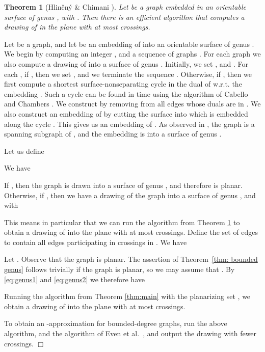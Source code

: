 \documentclass[twoside,leqno,twocolumn]{article}
\newtheorem{theorem}{Theorem}
\begin{document}
\begin{theorem}[Hlin\v{e}n\'{y} \& Chimani \cite{crossing_genus}]\label{thm:genus_soda}
Let  be a graph embedded in an orientable surface of genus , with .
Then there is an efficient algorithm that computes a drawing of  in the plane with at most  crossings.
\end{theorem}

Let  be a graph, and let  be an embedding of  into an orientable surface  of genus .
We begin by computing an integer , and a sequence of graphs .
For each graph  we also compute a drawing  of  into a surface of genus .
Initially, we set , and .
For each , if , then we set , and we terminate the sequence .
Otherwise, if , then 
we first compute a shortest surface-nonseparating cycle  in the dual of  w.r.t. the embedding . Such a cycle can be found in time  using the
algorithm of Cabello and Chambers \cite{CabelloC07}.
We construct  by removing from  all edges whose duals are in .
We also construct an embedding of  by cutting the surface into which  is embedded along the cycle .
This gives us an embedding  of .
As observed in \cite{crossing_genus}, the graph  is a spanning subgraph of , and the embedding  is into a surface of genus .

Let us define

We have


If , then the graph  is drawn into a surface of genus , and therefore  is planar.
Otherwise, if , then we have a drawing  of the graph  into a surface of genus , and with

This means in particular that we can run the algorithm from Theorem \ref{thm:genus_soda} to obtain a drawing  of  into the plane with at most  crossings.
Define the set  of edges to contain all edges participating in crossings in .
We have


Let .
Observe that the graph  is planar.
The assertion of Theorem~\ref{thm: bounded genus} follows trivially if the graph  is planar, so we may assume that .
By \eqref{eq:genus1} and \eqref{eq:genus2} we therefore have

Running the algorithm from Theorem \ref{thm:main} with the planarizing set , we obtain a drawing of  into the plane with at most  crossings.

To obtain an -approximation for bounded-degree graphs, 
run the above algorithm, and the algorithm of Even et al.~\cite{EvenGS02}, and output the drawing with fewer crossings.
\hfill \ensuremath{\Box}


\fi
\end{document}
